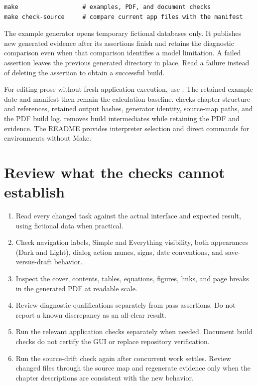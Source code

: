 \begin{lstlisting}
make                  # examples, PDF, and document checks
make check-source     # compare current app files with the manifest
\end{lstlisting}

The example generator opens temporary fictional databases only. It publishes new generated evidence after its assertions finish and retains the diagnostic comparison even when that comparison identifies a model limitation. A failed assertion leaves the previous generated directory in place. Read a failure instead of deleting the assertion to obtain a successful build.

For editing prose without fresh application execution, use . The retained example date and manifest then remain the calculation baseline.  checks chapter structure and references, retained output hashes, generator identity, source-map paths, and the PDF build log.  removes build intermediates while retaining the PDF and evidence. The README provides interpreter selection and direct commands for environments without Make.

\section{Review what the checks cannot establish}
\begin{enumerate}
\item Read every changed task against the actual interface and expected result, using fictional data when practical.
\item Check navigation labels, Simple and Everything visibility, both appearances (Dark and Light), dialog action names, signs, date conventions, and save-versus-draft behavior.
\item Inspect the cover, contents, tables, equations, figures, links, and page breaks in the generated PDF at readable scale.
\item Review diagnostic qualifications separately from pass assertions. Do not report a known discrepancy as an all-clear result.
\item Run the relevant application checks separately when needed. Document build checks do not certify the GUI or replace repository verification.
\item Run the source-drift check again after concurrent work settles. Review changed files through the source map and regenerate evidence only when the chapter descriptions are consistent with the new behavior.
\end{enumerate}

